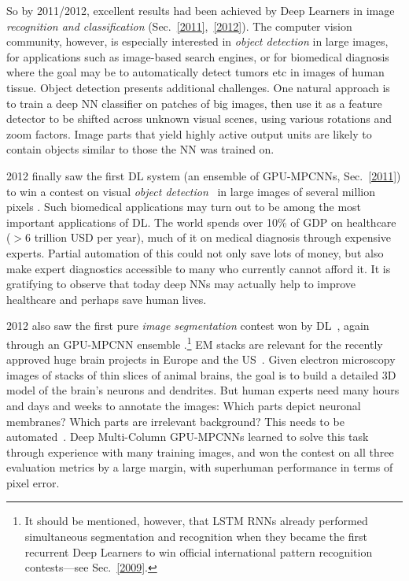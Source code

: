 \documentclass[letterpaper]{article}
\begin{document}
\begin{CJK*}{UTF8}{gbsn}
\begin{sloppypar}
So by 2011/2012, excellent results had been achieved by Deep Learners 
in image {\em recognition and classification} (Sec.~\ref{2011},~\ref{2012}).
The computer vision community, however, is especially interested in
 {\em object  detection} in large images,
for applications such as image-based search engines,
or for biomedical diagnosis where the goal may be to 
automatically detect tumors etc in images of human tissue.
Object detection presents additional challenges. 
One natural approach is to train a deep NN classifier on patches of big images,
then use it as a feature detector to be shifted 
across unknown visual scenes, using various rotations and zoom factors.
Image parts that yield highly active output units are likely
to contain objects similar to those the NN was trained on.

2012 finally saw the first DL system 
(an ensemble of GPU-MPCNNs, Sec.~\ref{2011}) to win a
contest on visual {\em object detection}~\citep{miccai2013} in large images of
several million pixels
\citep{icpr12,icpr12report}. 
Such biomedical applications may turn out to be among 
the most important applications of DL.
 The world spends over 10\% of GDP on healthcare ($>6$ trillion USD per year), much of it on medical diagnosis through expensive experts. Partial automation of this could not only save lots of money, but also make expert diagnostics accessible to many who currently cannot afford it.
It is gratifying to observe that today deep NNs may actually help to improve healthcare and 
perhaps save human lives. 


2012 also saw the 
first pure {\em image segmentation} contest won by DL~\citep{ciresan2012nips}, 
again through an GPU-MPCNN ensemble 
\citep{isbi12}.\footnote{It should be mentioned, however, that LSTM RNNs already performed simultaneous segmentation and recognition when they became the first recurrent Deep Learners to win official international pattern recognition contests---see Sec.~\ref{2009}.}
EM stacks are relevant for the recently approved huge brain projects in Europe and the US~\citep[e.g.,][]{markram2012}. Given electron microscopy images of stacks of thin slices of animal brains, the goal is to build a detailed 3D model of the brain's neurons and dendrites. But human experts need many hours and days and weeks to annotate the images: Which parts depict neuronal membranes? Which parts are irrelevant background? This needs to be automated~\citep[e.g.,][]{turaga2010}. Deep Multi-Column GPU-MPCNNs learned to solve this task through experience with many training images, and won the contest on all three evaluation metrics by a large margin, with superhuman performance in terms of pixel error. 


\end{sloppypar}
\end{CJK*}
\end{document}
